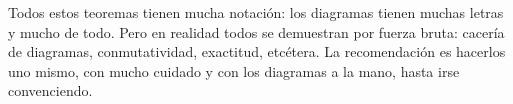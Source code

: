 \documentclass[11pt]{article}
\begin{document}
Todos estos teoremas tienen mucha notación: los diagramas tienen muchas letras y mucho de todo. Pero en realidad todos se demuestran por fuerza bruta: cacería de diagramas, conmutatividad, exactitud, etcétera. La recomendación es hacerlos uno mismo, con mucho cuidado y con los diagramas a la mano, hasta irse convenciendo.
\end{document}
